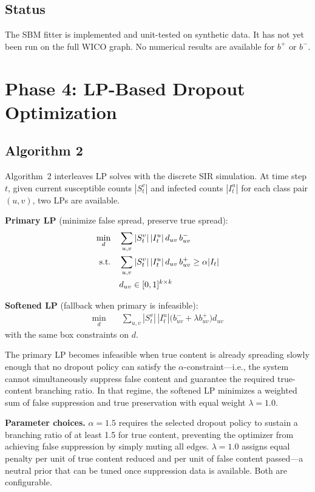 \documentclass[conference]{IEEEtran}
\begin{document}
\subsection{Status}

The SBM fitter is implemented and unit-tested on synthetic data.
It has not yet been run on the full WICO graph.
No numerical results are available for \(b^+\) or \(b^-\).

\section{Phase 4: LP-Based Dropout Optimization}

\subsection{Algorithm 2}

Algorithm~2 interleaves LP solves with the discrete SIR simulation.
At time step \(t\), given current susceptible counts \(|S^v_t|\) and infected
counts \(|I^u_t|\) for each class pair \((u,v)\), two LPs are available.

\textbf{Primary LP} (minimize false spread, preserve true spread):
\begin{align}
  \min_{d} \quad & \sum_{u,v} |S^v_t|\,|I^u_t|\,d_{uv}\,b^-_{uv} \label{eq:primary_obj} \\
  \text{s.t.} \quad
    & \sum_{u,v} |S^v_t|\,|I^u_t|\,d_{uv}\,b^+_{uv} \geq \alpha|I_t| \label{eq:primary_con} \\
    & d_{uv} \in [0,1]^{k \times k} \notag
\end{align}

\textbf{Softened LP} (fallback when primary is infeasible):
\begin{align}
  \min_{d} \quad & \sum_{u,v} |S^v_t|\,|I^u_t|\bigl(b^-_{uv} + \lambda b^+_{uv}\bigr)d_{uv}
  \label{eq:soft_obj}
\end{align}
with the same box constraints on \(d\).

The primary LP becomes infeasible when true content is already spreading slowly
enough that no dropout policy can satisfy the \(\alpha\)-constraint---i.e.,
the system cannot simultaneously suppress false content and guarantee the
required true-content branching ratio.
In that regime, the softened LP minimizes a weighted sum of false suppression
and true preservation with equal weight \(\lambda=1.0\).

\textbf{Parameter choices.}
\(\alpha=1.5\) requires the selected dropout policy to sustain a branching ratio
of at least 1.5 for true content, preventing the optimizer from achieving false
suppression by simply muting all edges.
\(\lambda=1.0\) assigns equal penalty per unit of true content reduced and per
unit of false content passed---a neutral prior that can be tuned once
suppression data is available.
Both are configurable.
\end{document}
